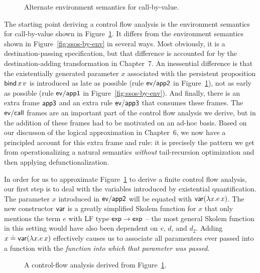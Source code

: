 \begin{figure}
\caption{Alternate environment semantics for call-by-value.}
\label{fig:dest-env}
\end{figure}

The starting point deriving a control flow analysis is the environment
semantics for call-by-value shown in Figure~\ref{fig:dest-env}. It
differs from the environment semantics shown in
Figure~\ref{fig:ssos-by-env} in several ways. Most obviously, it is a
destination-passing specification, but that difference is accounted
for by the destination-adding transformation in Chapter~7.  An
inessential difference is that the existentially generated parameter
$x$ associated with the persistent proposition ${\sf bind}\,x\,v$ is
introduced as late as possible (rule ${\sf ev/app2}$ in
Figure~\ref{fig:dest-env}), not as early as possible (rule ${\sf
  ev/app1}$ in Figure~\ref{fig:ssos-by-env}). And finally, there is an
extra frame ${\sf app3}$ and an extra rule ${\sf ev/app3}$ that
consumes these frames. The ${\sf ev/call}$ frames are an important
part of the control flow analysis we derive, but in
\cite{simmons11logical} the addition of these frames had to be
motivated on an ad-hoc basis. Based on our discusson of the logical
approximation in Chapter~6, we now have a principled account for this
extra frame and rule: it is precisely the pattern we get from
operationalizing a natural semantics {\it without} tail-recursion
optimization and then applying defunctionalization. 

In order for us to approximate Figure~\ref{fig:dest-env} to derive a
finite control flow analysis, our first step is to deal with the
variables introduced by existential quantification. The parameter $x$
introduced in ${\sf ev/app2}$ will be equated with ${\sf var}(\lambda
x.e\,x)$. The new constructor ${\sf var}$ is a greatly simplified
Skolem function for $x$ that only mentions the term $e$ with LF type
${\sf exp} \rightarrow {\sf exp}$ -- the most general Skolem function
in this setting would have also been dependent on $v$, $d$, and
$d_2$. Adding $x \doteq {\sf var}(\lambda x.e\,x)$ effectively causes
us to associate all paramenters ever passed into a function with the
{\it function into which that parameter was passed}. 

\begin{figure}
\caption{A control-flow analysis derived from Figure~\ref{fig:dest-env}.}
\label{fig:dest-cfa-1}
\end{figure}

